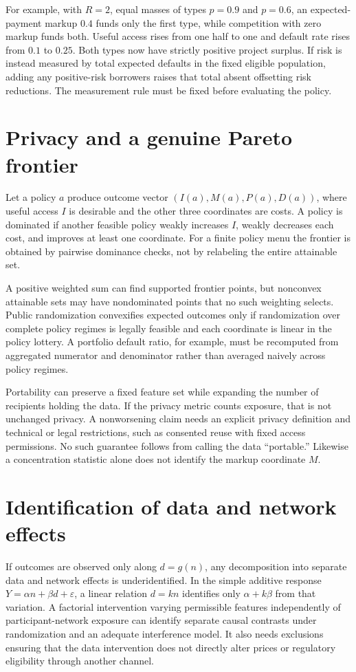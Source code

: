 \documentclass[11pt]{article}
\begin{document}
For example, with $R=2$, equal masses of types $p=0.9$ and $p=0.6$, an expected-payment markup $0.4$ funds only the first type, while competition with zero markup funds both. Useful access rises from one half to one and default rate rises from $0.1$ to $0.25$. Both types now have strictly positive project surplus. If risk is instead measured by total expected defaults in the fixed eligible population, adding any positive-risk borrowers raises that total absent offsetting risk reductions. The measurement rule must be fixed before evaluating the policy.

\section*{Privacy and a genuine Pareto frontier}
Let a policy $a$ produce outcome vector $(I(a),M(a),P(a),D(a))$, where useful access $I$ is desirable and the other three coordinates are costs. A policy is dominated if another feasible policy weakly increases $I$, weakly decreases each cost, and improves at least one coordinate. For a finite policy menu the frontier is obtained by pairwise dominance checks, not by relabeling the entire attainable set.

A positive weighted sum can find supported frontier points, but nonconvex attainable sets may have nondominated points that no such weighting selects. Public randomization convexifies expected outcomes only if randomization over complete policy regimes is legally feasible and each coordinate is linear in the policy lottery. A portfolio default ratio, for example, must be recomputed from aggregated numerator and denominator rather than averaged naively across policy regimes.

Portability can preserve a fixed feature set while expanding the number of recipients holding the data. If the privacy metric counts exposure, that is not unchanged privacy. A nonworsening claim needs an explicit privacy definition and technical or legal restrictions, such as consented reuse with fixed access permissions. No such guarantee follows from calling the data ``portable.'' Likewise a concentration statistic alone does not identify the markup coordinate $M$.

\section*{Identification of data and network effects}
If outcomes are observed only along $d=g(n)$, any decomposition into separate data and network effects is underidentified. In the simple additive response $Y=\alpha n+\beta d+\varepsilon$, a linear relation $d=kn$ identifies only $\alpha+k\beta$ from that variation. A factorial intervention varying permissible features independently of participant-network exposure can identify separate causal contrasts under randomization and an adequate interference model. It also needs exclusions ensuring that the data intervention does not directly alter prices or regulatory eligibility through another channel.
\end{document}
